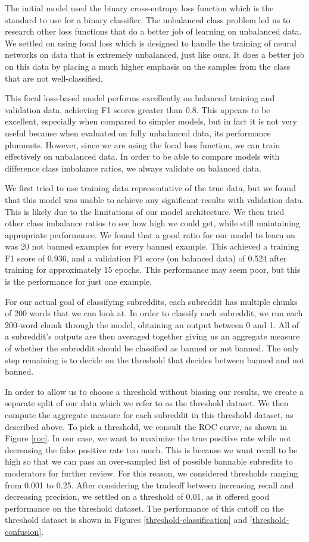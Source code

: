 \documentclass[11pt]{article}[twocolumn]
\begin{document}
The initial model used the binary cross-entropy loss function which is the standard to use for a binary classifier. The unbalanced class problem led us to research other loss functions that do a better job of learning on unbalanced data. We settled on using focal loss which is designed to handle the training of neural networks on data that is extremely unbalanced, just like ours. It does a better job on this data by placing a much higher emphasis on the samples from the class that are not well-classified. 

This focal loss-based model performs excellently on balanced training and validation data, achieving F1 scores greater than 0.8. This appears to be excellent, especially when compared to simpler models, but in fact it is not very useful because when evaluated on fully unbalanced data, its performance plummets. However, since we are using the focal loss function, we can train effectively on unbalanced data. In order to be able to compare models with difference class imbalance ratios, we always validate on balanced data.

We first tried to use training data representative of the true data, but we found that this model was unable to achieve any significant results with validation data. This is likely due to the limitations of our model architecture. We then tried other class imbalance ratios to see how high we could get, while still maintaining appropriate performance. We found that a good ratio for our model to learn on was 20 not banned examples for every banned example. This achieved a training F1 score of 0.936, and a validation F1 score (on balanced data) of 0.524 after training for approximately 15 epochs. This performance may seem poor, but this is the performance for just one example. 

For our actual goal of classifying subreddits, each subreddit has multiple chunks of 200 words that we can look at. In order to classify each subreddit, we run each 200-word chunk through the model, obtaining an output between 0 and 1. All of a subreddit's outputs are then averaged together giving us an aggregate measure of whether the subreddit should be classified as banned or not banned. The only step remaining is to decide on the threshold that decides between banned and not banned.


In order to allow us to choose a threshold without biasing our results, we create a separate split of our data which we refer to as the threshold dataset. We then compute the aggregate measure for each subreddit in this threshold dataset, as described above. To pick a threshold, we consult the ROC curve, as shown in Figure \ref{roc}. In our case, we want to maximize the true positive rate while not decreasing the false positive rate too much. This is because we want recall to be high so that we can pass an over-sampled list of possible bannable subredits to moderators for further review. For this reason, we considered thresholds ranging from 0.001 to 0.25. After considering the tradeoff between increasing recall and decreasing precision, we settled on a threshold of 0.01, as it offered good performance on the threshold dataset. The performance of this cutoff on the threshold dataset is shown in Figures \ref{threshold-classification} and \ref{threshold-confusion}.
\end{document}
